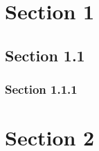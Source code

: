 \hypertarget{x-section-1}{\section{Section 1}}
\hypertarget{x-section-1.1}{\subsection{Section 1.1}}
\hypertarget{x-section-1.1.1}{\subsubsection{Section 1.1.1}}
\hypertarget{x-section-2}{\section{Section 2}}
